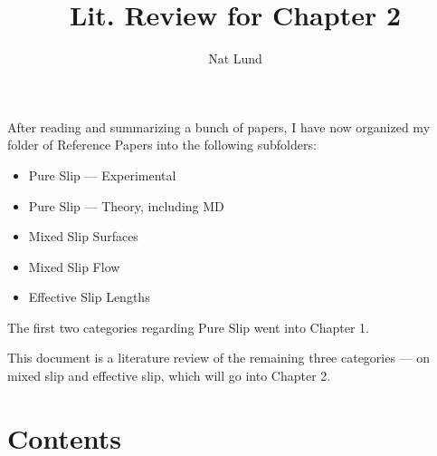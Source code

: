 \documentclass{article}
\title{Lit. Review for Chapter 2}
\author{Nat Lund}
\begin{document}
\maketitle

After reading and summarizing a bunch of papers, I have now organized my folder of Reference Papers into the following subfolders:
\begin{itemize}
    \item Pure Slip --- Experimental
    \item Pure Slip --- Theory, including MD
    \item Mixed Slip Surfaces
    \item Mixed Slip Flow
    \item Effective Slip Lengths
\end{itemize}

The first two categories regarding Pure Slip went into Chapter 1.

This document is a literature review of the remaining three categories --- on mixed slip and effective slip, which will go into Chapter 2.

\section*{Contents}
\end{document}
